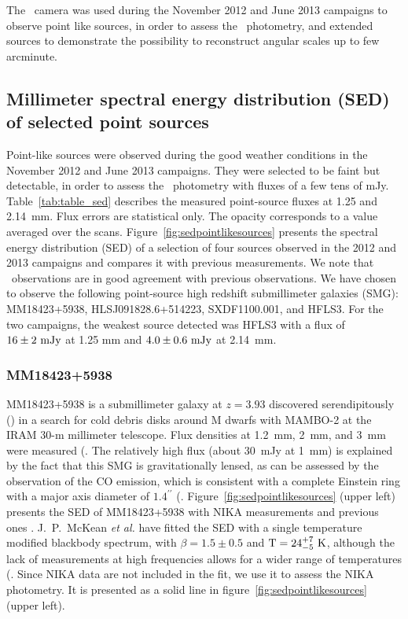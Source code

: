 The \NIKA\ camera was used during the November 2012 and June 2013
campaigns to observe point like sources, in order to assess the \NIKA\
photometry, and extended sources to demonstrate the possibility to reconstruct
angular scales up to few arcminute.


\subsection{Millimeter spectral energy distribution (SED) of selected point sources}
\label{SED}
Point-like sources were observed during the good weather conditions in
the November 2012 and June 2013 campaigns. They were selected to be faint
but detectable, in order to assess the \NIKA\ photometry
with fluxes of a few tens of mJy.
Table~\ref{tab:table_sed} describes the measured point-source fluxes at 1.25
and 2.14~mm. Flux errors are statistical only. The opacity corresponds to a
value averaged over the scans.  Figure~\ref{fig:sedpointlikesources} presents
the spectral energy distribution (SED) of a selection of four sources observed
in the 2012 and 2013 campaigns and compares it with previous measurements. We note
that \NIKA\ observations are in good agreement with previous
observations. We have chosen to observe the following point-source high redshift submillimeter
galaxies (SMG): MM18423+5938, HLSJ091828.6+514223, SXDF1100.001, and HFLS3. For the two campaigns, the weakest source detected
was HFLS3 with a flux of $16\pm 2 \ {\rm mJy}$ at 1.25 mm and $4.0 \pm 0.6 \ {\rm mJy}$ at 2.14~mm.


\subsubsection*{MM18423+5938}
MM18423+5938 is a submillimeter galaxy at $z = 3.93$ discovered
serendipitously (\cite{Lestrade:2009ef}) in a search for cold debris disks
around M dwarfs with MAMBO-2 at the IRAM 30-m millimeter telescope.
Flux densities at 1.2~mm, 2~mm, and 3~mm were measured
(\cite{Lestrade:2010wm}.  The relatively high flux (about 30~mJy at 1~mm) is
explained by the fact that this SMG is gravitationally lensed, as can be
assessed by the observation of the CO emission, which is consistent with a
complete Einstein ring with a major axis diameter of $1.4^{\prime\prime}$
(\cite{Lestrade:2011qq}.  
Figure~\ref{fig:sedpointlikesources} (upper left) presents the SED of
MM18423+5938 with NIKA measurements and previous ones \citep{Lestrade:2010wm}. J.~P.~McKean {\it et al.}  have fitted the SED with a
single temperature modified blackbody spectrum, with $\beta=1.5\pm 0.5$ and
$\rm T=24^{+7}_{-5} \ {\rm K}$, although the lack of measurements at high
frequencies allows for a wider range of temperatures (\cite{McKean:2011nk}. 
Since NIKA data are not included in the fit, we use it to assess the NIKA photometry. It is presented as a solid line 
in figure~\ref{fig:sedpointlikesources} (upper left).


